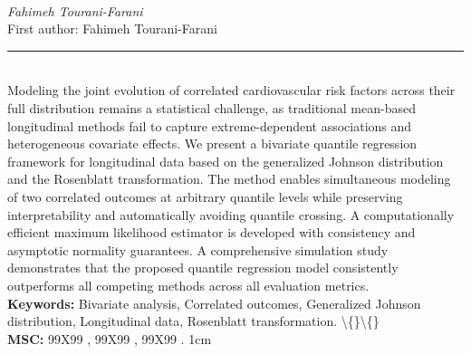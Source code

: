 \documentclass[10pt,twoside]{article}
\begin{document}
\noindent\begin{minipage}[t][\textheight]{\textwidth}
\\[0.35em]
{\itshape Fahimeh Tourani-Farani}\\[0.2em]
{\footnotesize First author: Fahimeh Tourani-Farani}\\[0.45em]
\noindent\rule{\textwidth}{0.3pt}\\[0.4em]
{\footnotesize  Modeling the joint evolution of correlated cardiovascular risk factors across their full distribution remains a statistical challenge, as traditional mean-based longitudinal methods fail to capture extreme-dependent associations and heterogeneous covariate effects. We present a bivariate quantile regression framework for longitudinal data based on the generalized Johnson distribution and the Rosenblatt transformation. The method enables simultaneous modeling of two correlated outcomes at arbitrary quantile levels while preserving interpretability and automatically avoiding quantile crossing. A computationally efficient maximum likelihood estimator is developed with consistency and asymptotic normality guarantees. A comprehensive simulation study demonstrates that the proposed quantile regression model consistently outperforms all competing methods across all evaluation metrics.}\\[0.4em]
{\footnotesize\bfseries Keywords:} {\footnotesize Bivariate analysis, Correlated outcomes, Generalized Johnson distribution, Longitudinal data, Rosenblatt transformation. \textbackslash\{\}\textbackslash\{\}}\\[0.15em]
{\footnotesize\bfseries MSC:} {\footnotesize 99X99 , 99X99 , 99X99 . 1cm}\\
\vfill
\end{minipage}
\newpage
\end{document}
